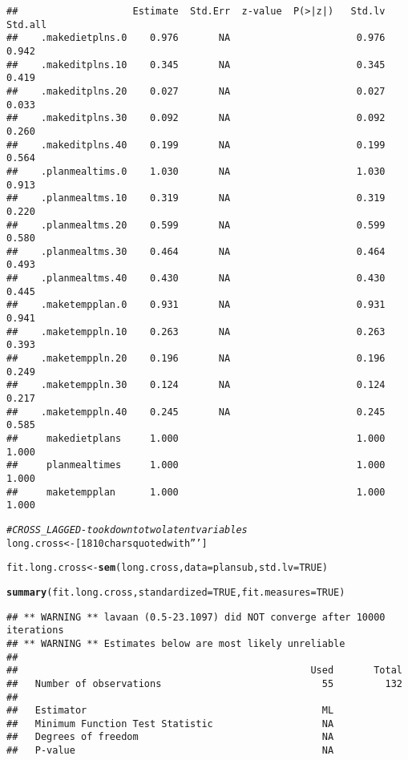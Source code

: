 \documentclass{article}\usepackage[]{graphicx}\usepackage[]{color}
\makeatletter
\newcommand{\hlnum}[1]{\textcolor[rgb]{0.686,0.059,0.569}{#1}}%
\newcommand{\hlstr}[1]{\textcolor[rgb]{0.192,0.494,0.8}{#1}}%
\newcommand{\hlcom}[1]{\textcolor[rgb]{0.678,0.584,0.686}{\textit{#1}}}%
\newcommand{\hlstd}[1]{\textcolor[rgb]{0.345,0.345,0.345}{#1}}%
\newcommand{\hlkwb}[1]{\textcolor[rgb]{0.69,0.353,0.396}{#1}}%
\newcommand{\hlkwc}[1]{\textcolor[rgb]{0.333,0.667,0.333}{#1}}%
\newcommand{\hlkwd}[1]{\textcolor[rgb]{0.737,0.353,0.396}{\textbf{#1}}}%
\newenvironment{kframe}{%
 \def\at@end@of@kframe{}%
 \ifinner\ifhmode%
  \def\at@end@of@kframe{\end{minipage}}%
  \begin{minipage}{\columnwidth}%
 \fi\fi%
 \def\FrameCommand##1{\hskip\@totalleftmargin \hskip-\fboxsep
 \colorbox{shadecolor}{##1}\hskip-\fboxsep
     \hskip-\linewidth \hskip-\@totalleftmargin \hskip\columnwidth}%
 \MakeFramed {\advance\hsize-\width
   \@totalleftmargin\z@ \linewidth\hsize
   \@setminipage}}%
 {\par\unskip\endMakeFramed%
 \at@end@of@kframe}
\newenvironment{knitrout}{}{} %
\makeatother
\begin{document}
\begin{knitrout}
\begin{kframe}
\begin{verbatim}
##                    Estimate  Std.Err  z-value  P(>|z|)   Std.lv  Std.all
##    .makedietplns.0    0.976       NA                      0.976    0.942
##    .makeditplns.10    0.345       NA                      0.345    0.419
##    .makeditplns.20    0.027       NA                      0.027    0.033
##    .makeditplns.30    0.092       NA                      0.092    0.260
##    .makeditplns.40    0.199       NA                      0.199    0.564
##    .planmealtims.0    1.030       NA                      1.030    0.913
##    .planmealtms.10    0.319       NA                      0.319    0.220
##    .planmealtms.20    0.599       NA                      0.599    0.580
##    .planmealtms.30    0.464       NA                      0.464    0.493
##    .planmealtms.40    0.430       NA                      0.430    0.445
##    .maketempplan.0    0.931       NA                      0.931    0.941
##    .maketemppln.10    0.263       NA                      0.263    0.393
##    .maketemppln.20    0.196       NA                      0.196    0.249
##    .maketemppln.30    0.124       NA                      0.124    0.217
##    .maketemppln.40    0.245       NA                      0.245    0.585
##     makedietplans     1.000                               1.000    1.000
##     planmealtimes     1.000                               1.000    1.000
##     maketempplan      1.000                               1.000    1.000
\end{verbatim}
\begin{alltt}
\hlcom{#CROSS_LAGGED - took down to two latent variables}
\hlstd{long.cross} \hlkwb{<-} \hlstr{[1810 chars quoted with ''']}

\hlstd{fit.long.cross} \hlkwb{<-} \hlkwd{sem}\hlstd{(long.cross,} \hlkwc{data}\hlstd{=plansub,} \hlkwc{std.lv}\hlstd{=}\hlnum{TRUE}\hlstd{)}
\end{alltt}


{\ttfamily\noindent\color{warningcolor}{\#\# Warning in lavaan::lavaan(model = long.cross, data = plansub, std.lv = TRUE, : lavaan WARNING: model has NOT converged!}}\begin{alltt}
\hlkwd{summary}\hlstd{(fit.long.cross,} \hlkwc{standardized}\hlstd{=}\hlnum{TRUE}\hlstd{,} \hlkwc{fit.measures}\hlstd{=}\hlnum{TRUE}\hlstd{)}
\end{alltt}
\begin{verbatim}
## ** WARNING ** lavaan (0.5-23.1097) did NOT converge after 10000 iterations
## ** WARNING ** Estimates below are most likely unreliable
## 
##                                                   Used       Total
##   Number of observations                            55         132
## 
##   Estimator                                         ML
##   Minimum Function Test Statistic                   NA
##   Degrees of freedom                                NA
##   P-value                                           NA
\end{verbatim}



\end{kframe}
\end{knitrout}
\end{document}
